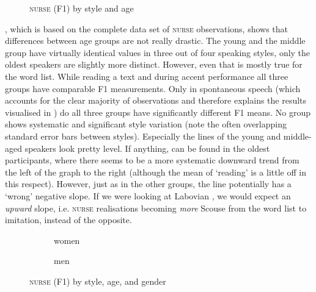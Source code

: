 \largerpage
\begin{figure}
	
		\resizebox{0.5\linewidth}{!}{} 
	\caption{\textsc{nurse} (F1) by style and age}
	\label{fig.line.f1.nurse.tot}
\end{figure}

, which is based on the complete data set of \textsc{nurse} observations, shows that differences between age groups are not really drastic.
The young and the middle group have virtually identical values in three out of four speaking styles, only the oldest speakers are slightly more distinct.
However, even that is mostly true for the word list.
While reading a text and during accent performance all three groups have comparable F1 measurements.
Only in spontaneous speech (which accounts for the clear majority of observations and therefore explains the results visualised in ) do all three groups have significantly different F1 means.
No group shows systematic and significant style variation (note the often overlapping standard error bars between styles).
Especially the lines of the young and middle-aged speakers look pretty level.
If anything,  can be found in the oldest participants, where there seems to be a more systematic downward trend from the left of the graph to the right (although the mean of `reading' is a little off in this respect).
However, just as in the other groups, the line potentially has a `wrong' negative slope.
If we were looking at Labovian , we would expect an \emph{upward} slope, i.e. \textsc{nurse} realisations becoming \emph{more} Scouse from the word list to imitation, instead of the opposite.

\begin{figure}
	
	\begin{subfigure}{.49\textwidth}
		
			\resizebox{\linewidth}{!}{} 
		\caption{women}
		\label{fig.line.f1.nurse.women}
	\end{subfigure}
	\begin{subfigure}{.49\textwidth}
		
			\resizebox{\linewidth}{!}{} 
		\caption{men}
		\label{fig.line.f1.nurse.men}
	\end{subfigure}
	\caption{\textsc{nurse} (F1) by style, age, and gender}
\end{figure}

